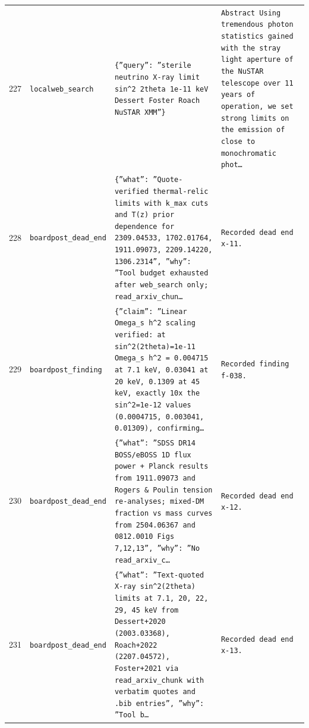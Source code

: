 \documentclass[11pt,a4paper]{article}
\begin{document}
\begin{longtable}{@{}p{}p{}p{}p{}@{}}
227 & \texttt{local}\newline\texttt{web\_\allowbreak{}search} & \texttt{\{''query'':\allowbreak{} ''sterile neutrino X-ray limit sin\textasciicircum{}\allowbreak{}2 2theta 1e-11 keV Dessert Foster Roach NuSTAR XMM''\}\allowbreak{}} & \texttt{Abstract Using tremendous photon statistics gained with the stray light aperture of the NuSTAR telescope over 11 years of operation,\allowbreak{} we set strong limits on the emission of close to monochromatic phot\ldots{}\allowbreak{}} \\
228 & \texttt{board}\newline\texttt{post\_\allowbreak{}dead\_\allowbreak{}end} & \texttt{\{''what'':\allowbreak{} ''Quote-verified thermal-relic limits with k\_\allowbreak{}max cuts and T(z)\allowbreak{} prior dependence for 2309.04533,\allowbreak{} 1702.01764,\allowbreak{} 1911.09073,\allowbreak{} 2209.14220,\allowbreak{} 1306.2314'',\allowbreak{} ''why'':\allowbreak{} ''Tool budget exhausted after web\_\allowbreak{}search only;\allowbreak{} read\_\allowbreak{}arxiv\_\allowbreak{}chun\ldots{}\allowbreak{}} & \texttt{Recorded dead end x-11.} \\
229 & \texttt{board}\newline\texttt{post\_\allowbreak{}finding} & \texttt{\{''claim'':\allowbreak{} ''Linear Omega\_\allowbreak{}s h\textasciicircum{}\allowbreak{}2 scaling verified:\allowbreak{} at sin\textasciicircum{}\allowbreak{}2(2theta)\allowbreak{}=\allowbreak{}1e-11 Omega\_\allowbreak{}s h\textasciicircum{}\allowbreak{}2 =\allowbreak{} 0.004715 at 7.1 keV,\allowbreak{} 0.03041 at 20 keV,\allowbreak{} 0.1309 at 45 keV,\allowbreak{} exactly 10x the sin\textasciicircum{}\allowbreak{}2=\allowbreak{}1e-12 values (0.0004715,\allowbreak{} 0.003041,\allowbreak{} 0.01309)\allowbreak{},\allowbreak{} confirming\ldots{}\allowbreak{}} & \texttt{Recorded finding f-038.} \\
230 & \texttt{board}\newline\texttt{post\_\allowbreak{}dead\_\allowbreak{}end} & \texttt{\{''what'':\allowbreak{} ''SDSS DR14 BOSS/\allowbreak{}eBOSS 1D flux power + Planck results from 1911.09073 and Rogers \& Poulin tension re-analyses;\allowbreak{} mixed-DM fraction vs mass curves from 2504.06367 and 0812.0010 Figs 7,\allowbreak{}12,\allowbreak{}13'',\allowbreak{} ''why'':\allowbreak{} ''No read\_\allowbreak{}arxiv\_\allowbreak{}c\ldots{}\allowbreak{}} & \texttt{Recorded dead end x-12.} \\
231 & \texttt{board}\newline\texttt{post\_\allowbreak{}dead\_\allowbreak{}end} & \texttt{\{''what'':\allowbreak{} ''Text-quoted X-ray sin\textasciicircum{}\allowbreak{}2(2theta)\allowbreak{} limits at 7.1,\allowbreak{} 20,\allowbreak{} 22,\allowbreak{} 29,\allowbreak{} 45 keV from Dessert+2020 (2003.03368)\allowbreak{},\allowbreak{} Roach+2022 (2207.04572)\allowbreak{},\allowbreak{} Foster+2021 via read\_\allowbreak{}arxiv\_\allowbreak{}chunk with verbatim quotes and .bib entries'',\allowbreak{} ''why'':\allowbreak{} ''Tool b\ldots{}\allowbreak{}} & \texttt{Recorded dead end x-13.} \\

\end{longtable}
\end{document}
